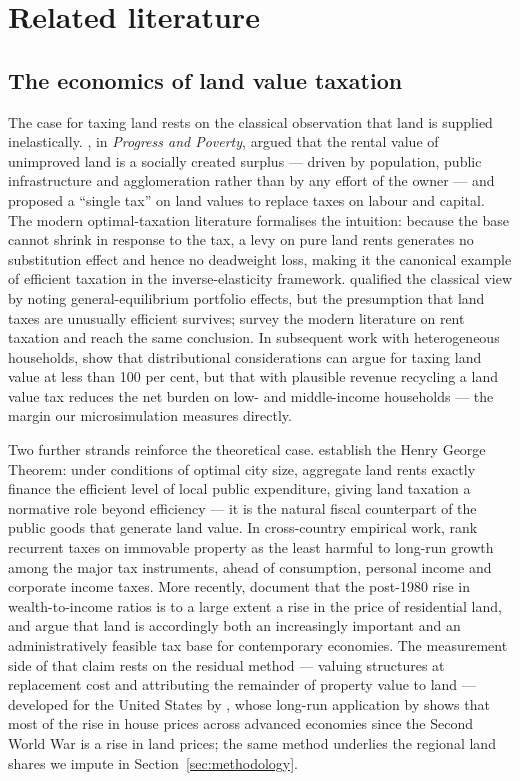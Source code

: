 \section{Related literature}
\label{sec:literature}

\subsection{The economics of land value taxation}

The case for taxing land rests on the classical observation that land is supplied inelastically. \citet{george1879}, in \emph{Progress and Poverty}, argued that the rental value of unimproved land is a socially created surplus --- driven by population, public infrastructure and agglomeration rather than by any effort of the owner --- and proposed a ``single tax'' on land values to replace taxes on labour and capital. The modern optimal-taxation literature formalises the intuition: because the base cannot shrink in response to the tax, a levy on pure land rents generates no substitution effect and hence no deadweight loss, making it the canonical example of efficient taxation in the \citet{ramsey1927} inverse-elasticity framework. \citet{feldstein1977} qualified the classical view by noting general-equilibrium portfolio effects, but the presumption that land taxes are unusually efficient survives; \citet{schwerhoff2020} survey the modern literature on rent taxation and reach the same conclusion. In subsequent work with heterogeneous households, \citet{schwerhoff2022} show that distributional considerations can argue for taxing land value at less than 100 per cent, but that with plausible revenue recycling a land value tax reduces the net burden on low- and middle-income households --- the margin our microsimulation measures directly.

Two further strands reinforce the theoretical case. \citet{arnott1979} establish the Henry George Theorem: under conditions of optimal city size, aggregate land rents exactly finance the efficient level of local public expenditure, giving land taxation a normative role beyond efficiency --- it is the natural fiscal counterpart of the public goods that generate land value. In cross-country empirical work, \citet{johansson2008} rank recurrent taxes on immovable property as the least harmful to long-run growth among the major tax instruments, ahead of consumption, personal income and corporate income taxes. More recently, \citet{bonnet2021} document that the post-1980 rise in wealth-to-income ratios is to a large extent a rise in the price of residential land, and argue that land is accordingly both an increasingly important and an administratively feasible tax base for contemporary economies. The measurement side of that claim rests on the residual method --- valuing structures at replacement cost and attributing the remainder of property value to land --- developed for the United States by \citet{davis2007}, whose long-run application by \citet{knoll2017} shows that most of the rise in house prices across advanced economies since the Second World War is a rise in land prices; the same method underlies the regional land shares we impute in Section~\ref{sec:methodology}.

